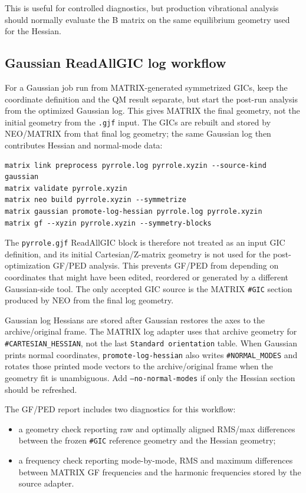 \documentclass[11pt]{article}
\begin{document}
\noindent
This is useful for controlled diagnostics, but production vibrational analysis
should normally evaluate the B matrix on the same equilibrium geometry used for
the Hessian.

\subsection{Gaussian ReadAllGIC log workflow}

For a Gaussian job run from MATRIX-generated symmetrized GICs, keep the
coordinate definition and the QM result separate, but start the post-run
analysis from the optimized Gaussian log.  This gives MATRIX the final
geometry, not the initial geometry from the \texttt{.gjf} input.  The GICs are
rebuilt and stored by NEO/MATRIX from that final log geometry; the same
Gaussian log then contributes Hessian and normal-mode data:

\begin{lstlisting}[style=oracle]
matrix link preprocess pyrrole.log pyrrole.xyzin --source-kind gaussian
matrix validate pyrrole.xyzin
matrix neo build pyrrole.xyzin --symmetrize
matrix gaussian promote-log-hessian pyrrole.log pyrrole.xyzin
matrix gf --xyzin pyrrole.xyzin --symmetry-blocks
\end{lstlisting}

\noindent
The \texttt{pyrrole.gjf} ReadAllGIC block is therefore not treated as an input
GIC definition, and its initial Cartesian/Z-matrix geometry is not used for the
post-optimization GF/PED analysis.  This prevents GF/PED from depending on
coordinates that might have been edited, reordered or generated by a different
Gaussian-side tool.  The only accepted GIC source is the MATRIX \texttt{\#GIC}
section produced by NEO from the final log geometry.

\noindent
Gaussian log Hessians are stored after Gaussian restores the axes to the
archive/original frame.  The MATRIX log adapter uses that archive geometry for
\texttt{\#CARTESIAN\_HESSIAN}, not the last \texttt{Standard orientation}
table.  When Gaussian prints normal coordinates, \texttt{promote-log-hessian}
also writes \texttt{\#NORMAL\_MODES} and rotates those printed mode vectors to
the archive/original frame when the geometry fit is unambiguous.  Add
\texttt{--no-normal-modes} if only the Hessian section should be refreshed.

\noindent
The GF/PED report includes two diagnostics for this workflow:

\begin{itemize}
  \item a geometry check reporting raw and optimally aligned RMS/max
  differences between the frozen \texttt{\#GIC} reference geometry and the
  Hessian geometry;
  \item a frequency check reporting mode-by-mode, RMS and maximum differences
  between MATRIX GF frequencies and the harmonic frequencies stored by the
  source adapter.
\end{itemize}
\end{document}
